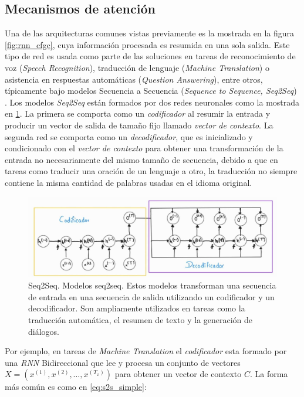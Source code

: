 \subsection{Mecanismos de atención} \label{section:att}

Una de las arquitecturas comunes vistas previamente es la mostrada en la figura \ref{fig:rnn_cfgc}, cuya información
procesada es resumida en una sola salida. Este tipo de red es usada como parte de las soluciones en
tareas de reconocimiento de voz (\textit{Speech Recognition}), traducción de lenguaje
(\textit{Machine Translation}) o asistencia en respuestas automáticas (\textit{Question Answering}), entre
otros,
típicamente bajo modelos Secuencia a Secuencia (\textit{Sequence to Sequence, Seq2Seq})
\cite{DBLP:journals/corr/ChoMGBSB14}. Los modelos
\textit{Seq2Seq} están formados por dos redes neuronales como la mostrada en \ref{fig:seq2seq}. La
primera se comporta como un \textit{codificador} al resumir la entrada y producir un vector de salida
de tamaño fijo llamado \textit{vector de contexto}. La segunda red se comporta como un
\textit{decodificador}, que es inicializado y condicionado con el
\textit{vector de contexto} para obtener una transformación de la entrada no necesariamente del
mismo tamaño de secuencia, debido a que en tareas como traducir una oración de un lenguaje a otro,
la traducción no siempre contiene la misma cantidad de palabras usadas en el idioma original.


\begin{figure}[ht!]
    \centering
    \includegraphics[width=1.0 \textwidth]{Chapters/2. Transformer/Figures/rnn/seq2seq.jpg}
    \caption{Seq2Seq. Modelos seq2seq. Estos modelos transforman una secuencia de entrada en una
             secuencia de salida utilizando un codificador y un decodificador. Son ampliamente
             utilizados en tareas como la traducción automática, el resumen de texto y la generación
             de diálogos.}
    \label{fig:seq2seq}
\end{figure}

Por ejemplo, en tareas de \textit{Machine Translation} el \textit{codificador} esta formado por una
\textit{RNN} Bidireccional que lee y procesa un conjunto de
vectores $X = (x^{(1)}, x^{(2)}, \dots, x^{(T_x)})$ para obtener un vector de contexto $C$. La forma
más común es como en \ref{eq:s2s_simple}:

